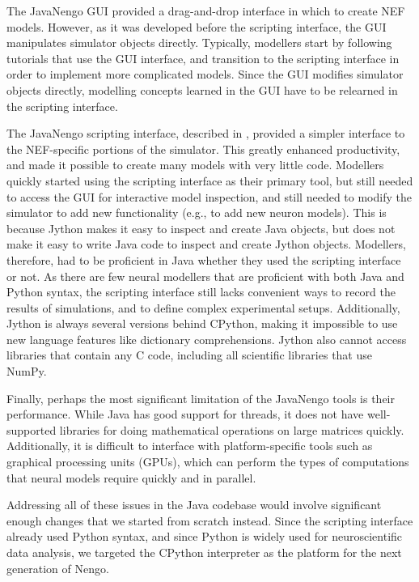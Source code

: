 \documentclass{frontiersSCNS}
\begin{document}
The JavaNengo GUI provided
a drag-and-drop interface in which to create NEF models.
However, as it was developed
before the scripting interface,
the GUI manipulates simulator objects directly.
Typically, modellers start by following
tutorials that use the GUI interface,
and transition to the scripting interface
in order to implement more complicated models.
Since the GUI modifies simulator objects directly,
modelling concepts learned in the GUI
have to be relearned in the scripting interface.

The JavaNengo scripting interface,
described in \cite{TODO},
provided a simpler interface
to the NEF-specific portions of the simulator.
This greatly enhanced productivity,
and made it possible
to create many models with very little code.
Modellers quickly started using
the scripting interface
as their primary tool,
but still needed to access the GUI
for interactive model inspection,
and still needed to modify the simulator
to add new functionality
(e.g., to add new neuron models).
This is because Jython makes it easy
to inspect and create Java objects,
but does not make it easy to
write Java code to
inspect and create Jython objects.
Modellers, therefore, had to be
proficient in Java whether
they used the scripting interface or not.
As there are few neural modellers
that are proficient with both Java and Python syntax,
the scripting interface still lacks
convenient ways to record the results of simulations,
and to define complex experimental setups.
Additionally, Jython is always several versions
behind CPython, making it impossible
to use new language features
like dictionary comprehensions.
Jython also cannot access libraries
that contain any C code,
including all scientific libraries
that use NumPy.

Finally, perhaps the most significant limitation
of the JavaNengo tools is their performance.
While Java has good support for threads,
it does not have well-supported libraries
for doing mathematical operations on large matrices quickly.
Additionally, it is difficult to interface with
platform-specific tools such as
graphical processing units (GPUs),
which can perform the types of computations
that neural models require quickly and in parallel.

Addressing all of these issues
in the Java codebase would involve
significant enough changes
that we started from scratch instead.
Since the scripting interface
already used Python syntax,
and since Python is widely used
for neuroscientific data analysis,
we targeted the CPython interpreter
as the platform for the next generation of Nengo.
\end{document}
